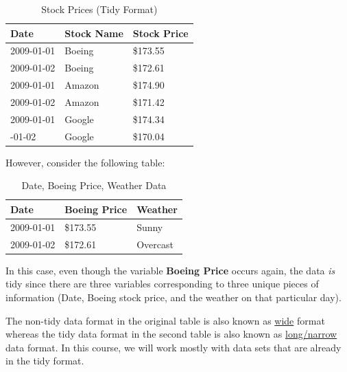 \documentclass[
  letterpaper,
  DIV=11,
  numbers=noendperiod]{scrartcl}
\begin{document}
\begingroup\fontsize{9}{11}\selectfont

\begin{longtable}[t]{lll}
\caption{\label{tab:unnamed-chunk-6}Stock Prices (Tidy Format)}\\
\toprule
Date & Stock Name & Stock Price\\
\midrule
2009-01-01 & Boeing & \$173.55\\
2009-01-02 & Boeing & \$172.61\\
2009-01-01 & Amazon & \$174.90\\
2009-01-02 & Amazon & \$171.42\\
2009-01-01 & Google & \$174.34\\
\addlinespace
2009-01-02 & Google & \$170.04\\
\bottomrule
\end{longtable}
\endgroup{}

However, consider the following table:

\begingroup\fontsize{9}{11}\selectfont

\begin{longtable}[t]{lll}
\caption{\label{tab:unnamed-chunk-7}Date, Boeing Price, Weather Data}\\
\toprule
Date & Boeing Price & Weather\\
\midrule
2009-01-01 & \$173.55 & Sunny\\
2009-01-02 & \$172.61 & Overcast\\
\bottomrule
\end{longtable}
\endgroup{}

In this case, even though the variable \textbf{Boeing Price} occurs
again, the data \emph{is} tidy since there are three variables
corresponding to three unique pieces of information (Date, Boeing stock
price, and the weather on that particular day).

The non-tidy data format in the original table is also known as
\href{https://en.wikipedia.org/wiki/Wide_and_narrow_data}{wide} format
whereas the tidy data format in the second table is also known as
\href{https://en.wikipedia.org/wiki/Wide_and_narrow_data\#Narrow}{long/narrow}
data format. In this course, we will work mostly with data sets that are
already in the tidy format.
\end{document}
